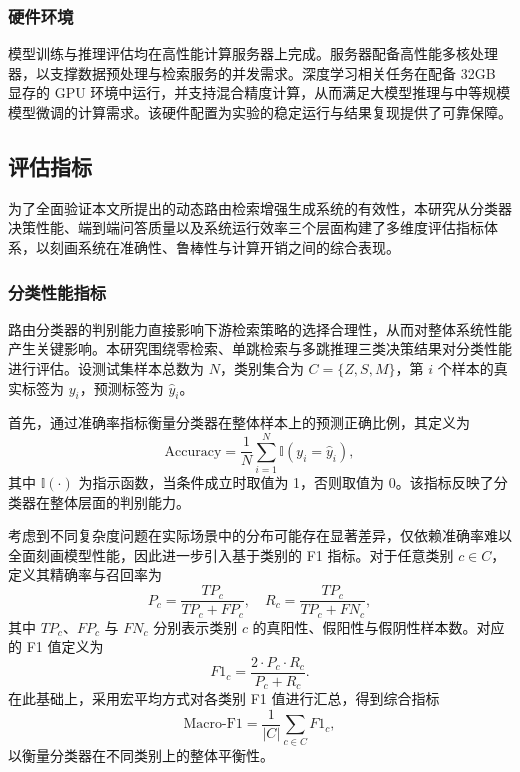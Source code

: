 \subsubsection{硬件环境}

模型训练与推理评估均在高性能计算服务器上完成。服务器配备高性能多核处理器，以支撑数据预处理与检索服务的并发需求。深度学习相关任务在配备 32GB 显存的 GPU 环境中运行，并支持混合精度计算，从而满足大模型推理与中等规模模型微调的计算需求。该硬件配置为实验的稳定运行与结果复现提供了可靠保障。


\subsection{评估指标}
\label{sec:evaluation_metrics}

为了全面验证本文所提出的动态路由检索增强生成系统的有效性，本研究从分类器决策性能、端到端问答质量以及系统运行效率三个层面构建了多维度评估指标体系，以刻画系统在准确性、鲁棒性与计算开销之间的综合表现。

\subsubsection{分类性能指标}

路由分类器的判别能力直接影响下游检索策略的选择合理性，从而对整体系统性能产生关键影响。本研究围绕零检索、单跳检索与多跳推理三类决策结果对分类性能进行评估。设测试集样本总数为 $N$，类别集合为 $C=\{Z,S,M\}$，第 $i$ 个样本的真实标签为 $y_i$，预测标签为 $\hat{y}_i$。

首先，通过准确率指标衡量分类器在整体样本上的预测正确比例，其定义为
\begin{equation}
\text{Accuracy} = \frac{1}{N} \sum_{i=1}^{N} \mathbb{I}(y_i = \hat{y}_i),
\end{equation}
其中 $\mathbb{I}(\cdot)$ 为指示函数，当条件成立时取值为 1，否则取值为 0。该指标反映了分类器在整体层面的判别能力。

考虑到不同复杂度问题在实际场景中的分布可能存在显著差异，仅依赖准确率难以全面刻画模型性能，因此进一步引入基于类别的 F1 指标。对于任意类别 $c \in C$，定义其精确率与召回率为
\begin{equation}
P_c = \frac{TP_c}{TP_c + FP_c}, \quad R_c = \frac{TP_c}{TP_c + FN_c},
\end{equation}
其中 $TP_c$、$FP_c$ 与 $FN_c$ 分别表示类别 $c$ 的真阳性、假阳性与假阴性样本数。对应的 F1 值定义为
\begin{equation}
F1_c = \frac{2 \cdot P_c \cdot R_c}{P_c + R_c}.
\end{equation}
在此基础上，采用宏平均方式对各类别 F1 值进行汇总，得到综合指标
\begin{equation}
\text{Macro-F1} = \frac{1}{|C|} \sum_{c \in C} F1_c,
\end{equation}
以衡量分类器在不同类别上的整体平衡性。

